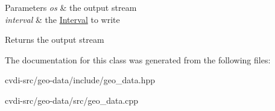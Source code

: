 \begin{DoxyParams}{Parameters}
{\em os} & the output stream \\
\hline
{\em interval} & the \hyperlink{classgeo__data_1_1Interval}{Interval} to write\\
\hline
\end{DoxyParams}
\begin{DoxyReturn}{Returns}
the output stream 
\end{DoxyReturn}


The documentation for this class was generated from the following files\+:\begin{DoxyCompactItemize}
\item 
cvdi-\/src/geo-\/data/include/geo\+\_\+data.\+hpp\item 
cvdi-\/src/geo-\/data/src/geo\+\_\+data.\+cpp\end{DoxyCompactItemize}
